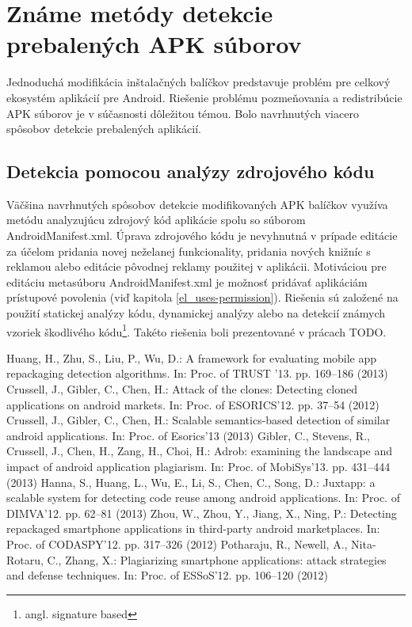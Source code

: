 \section{Známe metódy detekcie prebalených APK súborov}

Jednoduchá modifikácia inštalačných balíčkov predstavuje problém pre celkový ekosystém aplikácií pre Android. Riešenie problému pozmeňovania a redistribúcie APK súborov je v súčasnosti dôležitou témou. Bolo navrhnutých viacero spôsobov detekcie prebalených aplikácií. 

\subsection{Detekcia pomocou analýzy zdrojového kódu}
Väčšina navrhnutých spôsobov detekcie modifikovaných APK balíčkov využíva metódu analyzujúcu zdrojový kód aplikácie spolu so súborom AndroidManifest.xml. Úprava zdrojového kódu je nevyhnutná v prípade editácie za účelom pridania novej neželanej funkcionality, pridania nových knižníc s reklamou alebo editácie pôvodnej reklamy použitej v aplikácii. Motiváciou pre editáciu metasúboru AndroidManifest.xml je možnosť pridávať aplikáciám prístupové povolenia (viď kapitola \ref{el_uses-permission}).
Riešenia sú založené na použití statickej analýzy kódu, dynamickej analýzy alebo na detekcií známych vzoriek škodlivého kódu\footnote{angl. signature based}. Takéto riešenia boli prezentované v prácach TODO.

Huang, H., Zhu, S., Liu, P., Wu, D.: A framework for evaluating mobile app repackaging detection algorithms. In: Proc. of TRUST ’13. pp. 169–186 (2013)
Crussell, J., Gibler, C., Chen, H.: Attack of the clones: Detecting cloned applications on android markets. In: Proc. of ESORICS’12. pp. 37–54 (2012)
Crussell, J., Gibler, C., Chen, H.: Scalable semantics-based detection of similar android applications. In: Proc. of Esorics’13 (2013)
Gibler, C., Stevens, R., Crussell, J., Chen, H., Zang, H., Choi, H.: Adrob: examining the landscape and impact of android application plagiarism. In: Proc. of MobiSys’13. pp. 431–444 (2013)
Hanna, S., Huang, L., Wu, E., Li, S., Chen, C., Song, D.: Juxtapp: a scalable system for detecting code reuse among android applications. In: Proc. of DIMVA’12. pp. 62–81 (2013)
Zhou, W., Zhou, Y., Jiang, X., Ning, P.: Detecting repackaged smartphone applications in third-party android marketplaces. In: Proc. of CODASPY’12. pp. 317–326 (2012)	
Potharaju, R., Newell, A., Nita-Rotaru, C., Zhang, X.: Plagiarizing smartphone applications: attack strategies and defense techniques. In: Proc. of ESSoS’12. pp. 106–120 (2012)
	
